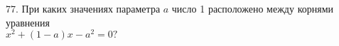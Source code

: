 77. При каких значениях параметра $a$ число 1 расположено между корнями уравнения \\$x^2+(1-a)x-a^2=0?$\\
